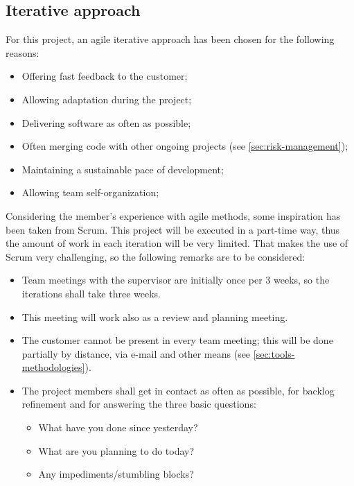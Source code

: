 \subsection{Iterative approach}
%
%
For this project, an agile iterative approach has been chosen for the following reasons:
\begin{itemize}
	\item Offering fast feedback to the customer;
	\item Allowing adaptation during the project;
	\item Delivering software as often as possible;
	\item Often merging code with other ongoing projects (see \autoref{sec:risk-management});
	\item Maintaining a sustainable pace of development;
	\item Allowing team self-organization;
\end{itemize}
%
Considering the member's experience with agile methods, some inspiration has been taken from Scrum.
This project will be executed in a part-time way, thus the amount of work in each iteration will be very limited.
That makes the use of Scrum very challenging, so the following remarks are to be considered:
\begin{itemize}
	\item Team meetings with the supervisor are initially once per 3 weeks, so the iterations shall take three weeks.
	\item This meeting will work also as a review and planning meeting.
	\item The customer cannot be present in every team meeting; this will be done partially by distance, via e-mail and other means (see \autoref{sec:tools-methodologies}).
	\item The project members shall get in contact as often as possible, for backlog refinement and for answering the three basic questions:
		\begin{itemize}
			\item What have you done since yesterday?
			\item What are you planning to do today?
			\item Any impediments/stumbling blocks?
		\end{itemize}
\end{itemize}

